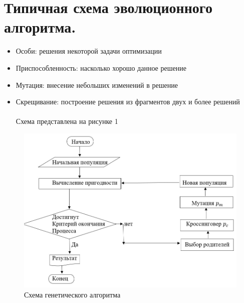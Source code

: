 \section{Типичная схема эволюционного алгоритма.}
\begin{itemize}
Нужно решить задачу оптимизации. На каждом этапе особи проходят отбор (выживание). Если особи не улучшают показатели, то  нет смысла впускать их в новую популяцию.  \\
     \\
Упрощенная эволюция, выполняемая на компьютере:\\
\item Особи: решения некоторой задачи оптимизации \\
\item Приспособленность: насколько хорошо данное решение\\
\item Мутация: внесение небольших изменений в решение\\
\item Скрещивание: построение решения из фрагментов двух и более решений\\
\\
Схема представлена на рисунке 1
\end{itemize}
\begin{figure}[h]
\centering
\includegraphics[width=0.8\linewidth]{images/Sxema.jpg}
\caption{Схема генетического алгоритма}
\label{fig:mpr}
\end{figure}
